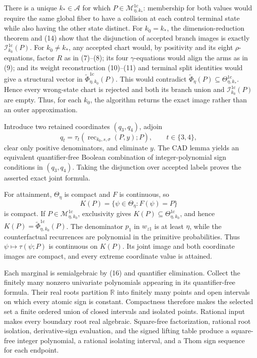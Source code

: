 There is a unique \(k_*\in\mathcal A\) for which \(P\in\mathcal M_{\eta,k_*}^{1\mathrm c}\): membership for both values would require the same global fiber to have a collision at each control terminal state while also having the other state distinct.  For \(k_0=k_*\), the dimension-reduction theorem and (14) show that the disjunction of accepted branch images is exactly \(\mathcal I_{k_0}^{1\mathrm c}(P)\).  For \(k_0\ne k_*\), any accepted chart would, by positivity and its eight \(\rho\)-equations, factor \(R\) as in (7)--(8); its four \(\gamma\)-equations would align the arms as in (9); and its weight reconstruction (10)--(11) and terminal split identities would give a structural vector in \(\widetilde\Phi_{\eta,k_0}^{1\mathrm c}(P)\).  This would contradict \(\widetilde\Phi_\eta(P)\subseteq\Theta_{\eta,k_*}^{1\mathrm c}\).  Hence every wrong-state chart is rejected and both its branch union and \(\mathcal I_{k_0}^{1\mathrm c}(P)\) are empty.  Thus, for each \(k_0\), the algorithm returns the exact image rather than an outer approximation.

Introduce two retained coordinates \((q_3,q_4)\), adjoin
\[
 q_t=\tau_t\!\left(\operatorname{rec}_{k_0,s,\sigma}(P,y);P\right),
 \qquad t\in\{3,4\},
 \tag{16}
\]
clear only positive denominators, and eliminate \(y\).  The CAD lemma yields an equivalent quantifier-free Boolean combination of integer-polynomial sign conditions in \((q_3,q_4)\).  Taking the disjunction over accepted labels proves the asserted exact joint formula.

For attainment, \(\Theta_\eta\) is compact and \(F\) is continuous, so
\[
 K(P)=\{\psi\in\Theta_\eta:F(\psi)=P\}
\]
is compact.  If \(P\in\mathcal M_{\eta,k_0}^{1\mathrm c}\), exclusivity gives \(K(P)\subseteq\Theta_{\eta,k_0}^{1\mathrm c}\), and hence \(K(P)=\widetilde\Phi_{\eta,k_0}^{1\mathrm c}(P)\).  The denominator \(p_1\) in \(w_{z1}\) is at least \(\eta\), while the counterfactual recurrences are polynomial in the primitive probabilities.  Thus \(\psi\mapsto\tau(\psi;P)\) is continuous on \(K(P)\).  Its joint image and both coordinate images are compact, and every extreme coordinate value is attained.

Each marginal is semialgebraic by (16) and quantifier elimination.  Collect the finitely many nonzero univariate polynomials appearing in its quantifier-free formula.  Their real roots partition \(\mathbb R\) into finitely many points and open intervals on which every atomic sign is constant.  Compactness therefore makes the selected set a finite ordered union of closed intervals and isolated points.  Rational input makes every boundary root real algebraic.  Square-free factorization, rational root isolation, derivative-sign evaluation, and the signed lifting table produce a square-free integer polynomial, a rational isolating interval, and a Thom sign sequence for each endpoint.

